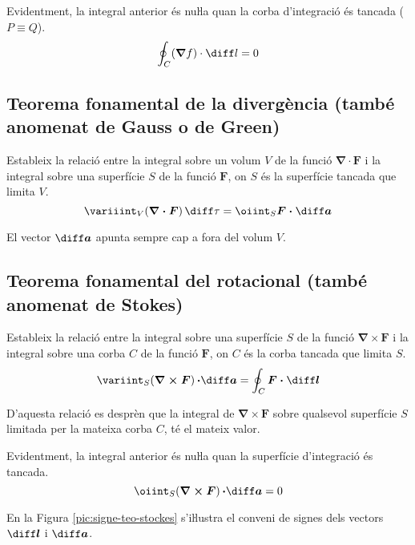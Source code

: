 \documentclass[catalan,a4paper,twoside,11pt]{article}
\begin{document}
Evidentment, la integral anterior és nuŀla quan la corba d'integració és tancada ($P \equiv Q$).
\begin{equation}
    \oint_C (\boldsymbol{\nabla}f) \cdot \diff l = 0
\end{equation}

\subsection{Teorema fonamental de la divergència (també anomenat de Gauss o de Green)}
Estableix la relació entre la integral sobre un volum $V$ de la funció $\boldsymbol{\nabla\cdot F}$ i la integral sobre una superfície $S$ de la funció $\boldsymbol{F}$, on $S$ és la superfície tancada que limita $V$.
\begin{equation}
    \variiint_V(\boldsymbol{\nabla\cdot F})\,\diff \tau = \oiint_S\boldsymbol{F\cdot\diff a}
\end{equation}

El vector $\boldsymbol{\diff a}$ apunta sempre cap a fora del volum $V$.

\subsection{Teorema fonamental del rotacional (també anomenat de Stokes)}
Estableix la relació entre la integral sobre una superfície $S$ de la funció $\boldsymbol{\nabla\times F}$ i la integral sobre una corba $C$ de la funció $\boldsymbol{F}$, on $C$ és la corba tancada que limita $S$.
\begin{equation}
    \variint_S(\boldsymbol{\nabla\times F})\boldsymbol{\,\cdot\diff a} =
    \oint_C\boldsymbol{F\cdot\diff l}
\end{equation}

D'aquesta relació es desprèn que la integral de $\boldsymbol{\nabla\times F}$ sobre qualsevol superfície $S$ limitada per la mateixa corba $C$, té el mateix valor.

Evidentment, la integral anterior és nuŀla quan la superfície d'integració és tancada.
\begin{equation}
    \oiint_S(\boldsymbol{\nabla\times F})\boldsymbol{\,\cdot\diff a} = 0
\end{equation}

En la Figura \vref{pic:signe-teo-stockes} s'iŀlustra el conveni de
signes dels vectors $\boldsymbol{\diff l}$ i $\boldsymbol{\diff a}$.

\begin{center}
	
	\label{pic:signe-teo-stockes}
\end{center}
\end{document}
